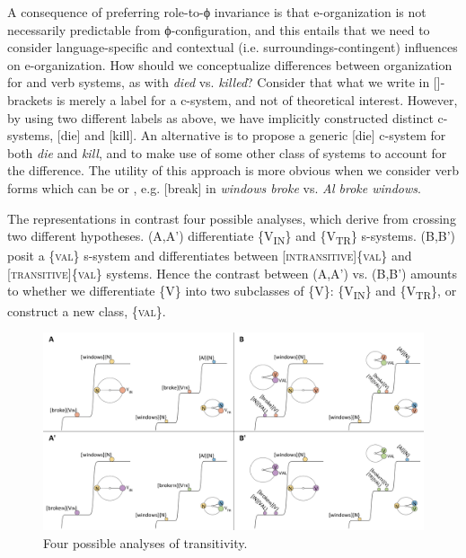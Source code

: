   A consequence of preferring role-to-ϕ invariance is that e-organization is not necessarily predictable from ϕ-configuration, and this entails that we need to consider language-specific and contextual (i.e. surroundings-contingent) influences on e-organization. How should we conceptualize differences between organization for  and  verb systems, as with \textit{died} vs. \textit{killed}? Consider that what we write in []-brackets is merely a label for a c-system, and not of theoretical interest. However, by using two different labels as above, we have implicitly constructed distinct c-systems, [die] and [kill]. An alternative is to propose a generic [die] c-system for both \textit{die} and \textit{kill}, and to make use of some other class of systems to account for the  difference. The utility of this approach is more obvious when we consider verb forms which can be  or , e.g. [break] in \textit{windows broke} vs. \textit{Al broke windows}. 

  The representations in {} contrast four possible analyses, which derive from crossing two different hypotheses. (A,A') differentiate  \{V\textsubscript{IN}\} and  \{V\textsubscript{TR}\} s-systems. (B,B') posit a  \{\textsc{val}\} s-system and differentiates between [\textsc{intransitive}]\{\textsc{val}\} and [\textsc{transitive}]\{\textsc{val}\} systems. Hence the contrast between (A,A') vs. (B,B') amounts to whether we differentiate \{V\} into two subclasses of \{V\}: \{V\textsubscript{IN}\} and \{V\textsubscript{TR}\}, or construct a new class, \{\textsc{val}\}.

  
\begin{figure}
\includegraphics[width=\textwidth]{figures/Tilsen-img72.png}
\caption{Four possible analyses of transitivity.}
\label{fig:4:22}
\end{figure}
 

